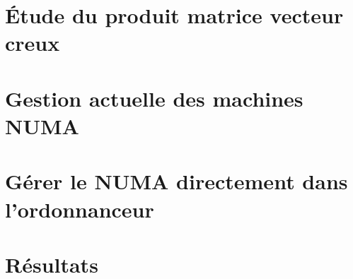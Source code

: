 \documentclass[twoside,10pt]{classes/Thesis}
\begin{document}
\section{\'Etude du produit matrice vecteur creux}




\section{Gestion actuelle des machines NUMA}









\section{Gérer le NUMA directement dans l'ordonnanceur}




\section{Résultats}






\end{document}
